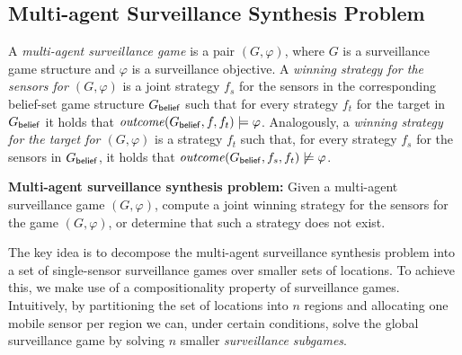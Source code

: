 

\subsection{Multi-agent Surveillance Synthesis Problem}
A \emph{multi-agent surveillance game} is a pair $(G,\varphi)$, where $G$ is a surveillance game structure and $\varphi$ is a surveillance objective. A \emph{winning strategy for the sensors for $(G,\varphi)$} is a joint strategy $f_s$ for the sensors in the corresponding belief-set game structure $G_{\mathsf{belief}}$ such that for every strategy $f_t$ for the target in $G_{\mathsf{belief}}$ it holds that $\mathit{outcome}(G_{\mathsf{belief}},f,f_t) \models \varphi$. Analogously, a \emph{winning strategy for the target for $(G,\varphi)$} is a strategy $f_t$ such that, for every strategy $f_s$ for the sensors in $G_{\mathsf{belief}}$, it holds that $\mathit{outcome}(G_{\mathsf{belief}},f_s,f_t) \not\models \varphi$.

{\bf Multi-agent surveillance synthesis problem:} Given a multi-agent surveillance game $(G,\varphi)$, compute a joint winning strategy for the sensors for the game $(G,\varphi)$, or determine that such a strategy does not exist.

The key idea is to decompose the multi-agent surveillance synthesis problem into a set of single-sensor surveillance games over smaller sets of locations. To achieve this, we make use of a compositionality property of surveillance games. Intuitively, by partitioning the set of locations into $n$ regions and allocating one mobile sensor per region we can, under certain conditions, solve the global surveillance game by solving $n$ smaller \emph{surveillance subgames}. 